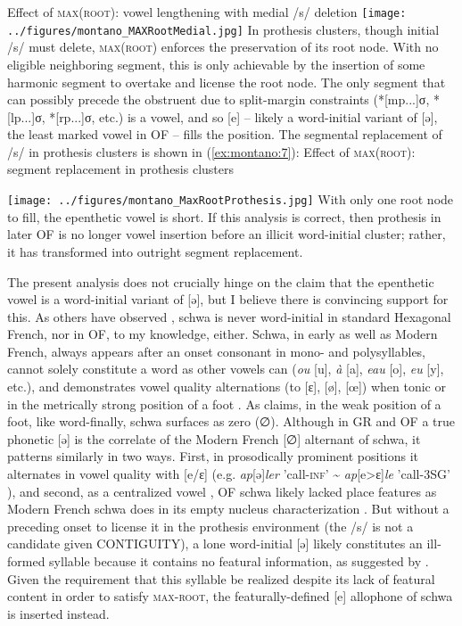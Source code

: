 \documentclass[output=paper,colorlinks,citecolor=brown,
]{langscibook}
\begin{document}
\ea \label{ex:montano:6} Effect of \textsc{max}(\textsc{root}): vowel lengthening with medial /s/ deletion
\texttt{[image: ../figures/montano\_MAXRootMedial.jpg]}
\z
\noindent In prothesis clusters, though initial /s/ must delete, \textsc{max}(\textsc{root}) enforces the preservation of its root node.  With no eligible neighboring segment, this is only achievable by the insertion of some harmonic segment to overtake and license the root node.  The only segment that can possibly precede the obstruent due to split-margin constraints (*[mp...]σ, *[lp...]σ, *[rp...]σ, etc.) is a vowel, and so [e] – likely a word-initial variant of [ə], the least marked vowel in OF – fills the position.  The segmental replacement of /s/ in prothesis clusters is shown in (\ref{ex:montano:7}):
\ea \label{ex:montano:7} Effect of \textsc{max}(\textsc{root}): segment replacement in prothesis clusters

\texttt{[image: ../figures/montano\_MaxRootProthesis.jpg]}
\z
\noindent With only one root node to fill, the epenthetic vowel is short.  If this analysis is correct, then prothesis in later OF is no longer vowel insertion before an illicit word-initial cluster; rather, it has transformed into outright segment replacement.

The present analysis does not crucially hinge on the claim that the epenthetic vowel is a word-initial variant of [ə], but I believe there is convincing support for this.  As others have observed \citep{Anderson1982, dell1995}, schwa is never word-initial in standard Hexagonal French, nor in OF, to my knowledge, either.  Schwa, in early as well as Modern French, always appears after an onset consonant in mono- and polysyllables, cannot solely constitute a word as other vowels can (\textit{ou} [u], \textit{à} [a], \textit{eau} [o], \textit{eu} [y], etc.), and demonstrates vowel quality alternations (to [ɛ], [ø], [œ]) when tonic \citep{Anderson1982, dell1995} or in the metrically strong position of a foot \citep{Montreuil2002}.  As \citet{Montreuil2002} claims, in the weak position of a foot, like word-finally, schwa surfaces as zero (∅).  Although in GR and OF a true phonetic [ə] \citep{Pope1952, Montreuil2002} is the correlate of the Modern French [∅] alternant of schwa, it patterns similarly in two ways.  First, in prosodically prominent positions it alternates in vowel quality with [e/ɛ] (e.g. \textit{ap}[ə]\textit{ler} 'call-\textsc{inf}' \~{} \textit{ap}[e>ɛ]\textit{le} 'call-3SG' \citep{Pope1952, Rainsford2020}), and second, as a centralized vowel \citep{Pope1952}, OF schwa likely lacked place features as Modern French schwa does in its empty nucleus characterization \citep{Anderson1982, Eychenne2006}.  But without a preceding onset to license it in the prothesis environment (the /s/ is not a candidate given CONTIGUITY), a lone word-initial [ə] likely constitutes an ill-formed syllable because it contains no featural information, as suggested by \citet{Rainsford2020}.  Given the requirement that this syllable be realized despite its lack of featural content in order to satisfy \textsc{max}-\textsc{root}, the featurally-defined [e] allophone of schwa is inserted instead.
	
\end{document}
